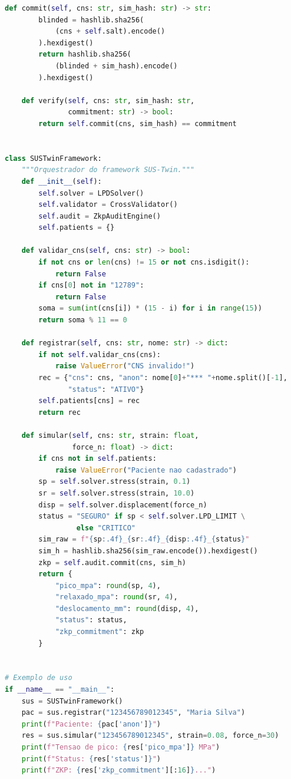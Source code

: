 \begin{lstlisting}[language=Python, caption={Implementação prática do SUS-Twin Framework (LPD Solver, Cross-Validation e Contraprova ZKP)}, label={lst:sus_twin_code}]
    def commit(self, cns: str, sim_hash: str) -> str:
        blinded = hashlib.sha256(
            (cns + self.salt).encode()
        ).hexdigest()
        return hashlib.sha256(
            (blinded + sim_hash).encode()
        ).hexdigest()

    def verify(self, cns: str, sim_hash: str,
               commitment: str) -> bool:
        return self.commit(cns, sim_hash) == commitment


class SUSTwinFramework:
    """Orquestrador do framework SUS-Twin."""
    def __init__(self):
        self.solver = LPDSolver()
        self.validator = CrossValidator()
        self.audit = ZkpAuditEngine()
        self.patients = {}

    def validar_cns(self, cns: str) -> bool:
        if not cns or len(cns) != 15 or not cns.isdigit():
            return False
        if cns[0] not in "12789":
            return False
        soma = sum(int(cns[i]) * (15 - i) for i in range(15))
        return soma % 11 == 0

    def registrar(self, cns: str, nome: str) -> dict:
        if not self.validar_cns(cns):
            raise ValueError("CNS invalido!")
        rec = {"cns": cns, "anon": nome[0]+"*** "+nome.split()[-1],
               "status": "ATIVO"}
        self.patients[cns] = rec
        return rec

    def simular(self, cns: str, strain: float,
                force_n: float) -> dict:
        if cns not in self.patients:
            raise ValueError("Paciente nao cadastrado")
        sp = self.solver.stress(strain, 0.1)
        sr = self.solver.stress(strain, 10.0)
        disp = self.solver.displacement(force_n)
        status = "SEGURO" if sp < self.solver.LPD_LIMIT \
                 else "CRITICO"
        sim_raw = f"{sp:.4f}_{sr:.4f}_{disp:.4f}_{status}"
        sim_h = hashlib.sha256(sim_raw.encode()).hexdigest()
        zkp = self.audit.commit(cns, sim_h)
        return {
            "pico_mpa": round(sp, 4),
            "relaxado_mpa": round(sr, 4),
            "deslocamento_mm": round(disp, 4),
            "status": status,
            "zkp_commitment": zkp
        }


# Exemplo de uso
if __name__ == "__main__":
    sus = SUSTwinFramework()
    pac = sus.registrar("123456789012345", "Maria Silva")
    print(f"Paciente: {pac['anon']}")
    res = sus.simular("123456789012345", strain=0.08, force_n=30)
    print(f"Tensao de pico: {res['pico_mpa']} MPa")
    print(f"Status: {res['status']}")
    print(f"ZKP: {res['zkp_commitment'][:16]}...")
\end{lstlisting}

